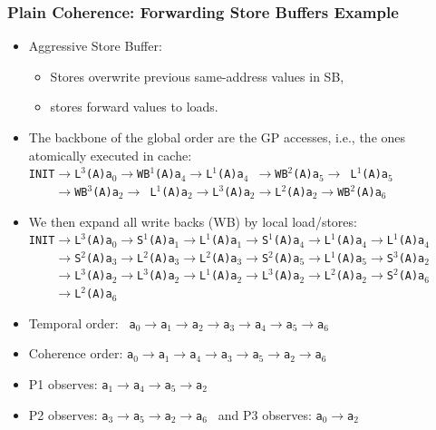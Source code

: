 \documentclass{beamer}
\begin{document}
\begin{frame}[fragile,t]
\frametitle{Plain Coherence: Forwarding Store Buffers Example}

\begin{itemize}
    \item Aggressive Store Buffer:
        \begin{itemize}
            \item Stores overwrite previous same-address values in SB, 
            \item stores forward values to loads.
        \end  {itemize}

    \item The backbone of the global order are the GP accesses, i.e.,
            the ones atomically executed in cache:\\
            {\tt{}INIT$\rightarrow$L$^3$(A)a$_0$$\rightarrow$WB$^1$(A)a$_4$$\rightarrow$L$^1$(A)a$_4$ $\rightarrow$WB$^2$(A)a$_5$$\rightarrow$ L$^1$(A)a$_5$}\\
            {\tt~~~~$\rightarrow$WB$^3$(A)a$_2$$\rightarrow$ L$^1$(A)a$_2$$\rightarrow$L$^3$(A)a$_2$$\rightarrow$L$^2$(A)a$_2$$\rightarrow$WB$^2$(A)a$_6$}\medskip

    \item We then expand all write backs (WB) by local load/stores:\\
           {\tt{}INIT$\rightarrow$L$^3$(A)a$_0$$\rightarrow$S$^1$(A)a$_1$$\rightarrow$L$^1$(A)a$_1$$\rightarrow$S$^1$(A)a$_4$$\rightarrow$L$^1$(A)a$_4$$\rightarrow$L$^1$(A)a$_4$}\\
           {\tt~~~~$\rightarrow$S$^2$(A)a$_3$$\rightarrow$L$^2$(A)a$_3$$\rightarrow$L$^2$(A)a$_3$$\rightarrow$S$^2$(A)a$_5$$\rightarrow$L$^1$(A)a$_5$$\rightarrow$S$^3$(A)a$_2$}\\
           {\tt~~~~$\rightarrow$L$^3$(A)a$_2$$\rightarrow$L$^3$(A)a$_2$$\rightarrow$L$^1$(A)a$_2$$\rightarrow$L$^3$(A)a$_2$$\rightarrow$L$^2$(A)a$_2$$\rightarrow$S$^2$(A)a$_6$}\\ 
           {\tt~~~~$\rightarrow$L$^2$(A)a$_6$}\medskip

    \item Temporal order: {\tt~a$_0\rightarrow$a$_1\rightarrow$a$_2\rightarrow$a$_3\rightarrow$a$_4\rightarrow$a$_5\rightarrow$a$_6$}
    \item Coherence order: {\tt a$_0\rightarrow$a$_1\rightarrow$a$_4\rightarrow$a$_3\rightarrow$a$_5\rightarrow$a$_2\rightarrow$a$_6$}
    \item P1 observes: {\tt a$_1\rightarrow$a$_4\rightarrow$a$_5\rightarrow$a$_2$}
    \item P2 observes: {\tt a$_3\rightarrow$a$_5\rightarrow$a$_2\rightarrow$a$_6$~} and 
    P3 observes: {\tt a$_0\rightarrow$a$_2$}

\end{itemize}


\end{frame}
\end{document}
